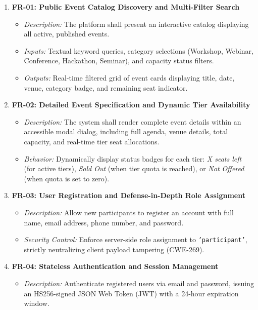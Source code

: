 \documentclass[11pt,a4paper]{report}
\begin{document}
\begin{enumerate}[leftmargin=1.5em, itemsep=0.8em]
    \item \textbf{FR-01: Public Event Catalog Discovery and Multi-Filter Search}
    \begin{itemize}[leftmargin=1.2em, itemsep=0.2em]
        \item \textit{Description:} The platform shall present an interactive catalog displaying all active, published events.
        \item \textit{Inputs:} Textual keyword queries, category selections (Workshop, Webinar, Conference, Hackathon, Seminar), and capacity status filters.
        \item \textit{Outputs:} Real-time filtered grid of event cards displaying title, date, venue, category badge, and remaining seat indicator.
    \end{itemize}

    \item \textbf{FR-02: Detailed Event Specification and Dynamic Tier Availability}
    \begin{itemize}[leftmargin=1.2em, itemsep=0.2em]
        \item \textit{Description:} The system shall render complete event details within an accessible modal dialog, including full agenda, venue details, total capacity, and real-time tier seat allocations.
        \item \textit{Behavior:} Dynamically display status badges for each tier: \textit{X seats left} (for active tiers), \textit{Sold Out} (when tier quota is reached), or \textit{Not Offered} (when quota is set to zero).
    \end{itemize}

    \item \textbf{FR-03: User Registration and Defense-in-Depth Role Assignment}
    \begin{itemize}[leftmargin=1.2em, itemsep=0.2em]
        \item \textit{Description:} Allow new participants to register an account with full name, email address, phone number, and password.
        \item \textit{Security Control:} Enforce server-side role assignment to \texttt{'participant'}, strictly neutralizing client payload tampering (CWE-269).
    \end{itemize}

    \item \textbf{FR-04: Stateless Authentication and Session Management}
    \begin{itemize}[leftmargin=1.2em, itemsep=0.2em]
        \item \textit{Description:} Authenticate registered users via email and password, issuing an HS256-signed JSON Web Token (JWT) with a 24-hour expiration window.
    \end{itemize}


\end{enumerate}
\end{document}
